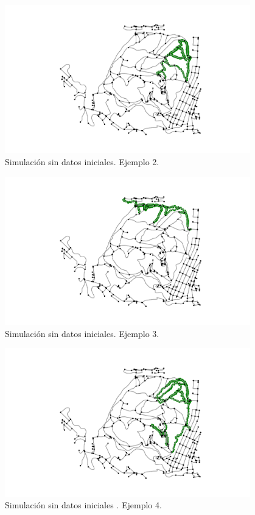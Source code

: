 \begin{figure}[h]
\begin{center}
\includegraphics[width=0.95\textwidth]{./Imagenes/empty-simulation/track2.png}
\caption{Simulación sin datos iniciales. Ejemplo 2.}
\end{center}
\label{figure:Simulation2}
\end{figure}

\begin{figure}[h]
\begin{center}
\includegraphics[width=0.95\textwidth]{./Imagenes/empty-simulation/track3.png}
\caption{Simulación sin datos iniciales. Ejemplo 3.}
\end{center}
\label{figure:Simulation3}
\end{figure}

\begin{figure}[h]
\begin{center}
\includegraphics[width=0.95\textwidth]{./Imagenes/empty-simulation/track4.png}
\caption{Simulación sin datos iniciales . Ejemplo 4.}
\end{center}
\label{figure:Simulation4}
\end{figure}